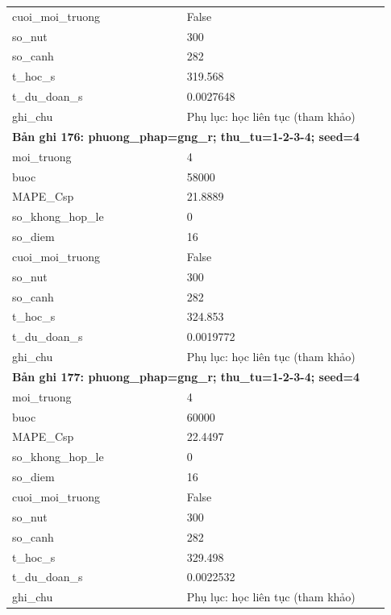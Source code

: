 \begin{longtable}{p{0.43\linewidth}p{0.50\linewidth}}
cuoi\_\allowbreak moi\_\allowbreak truong & False \\
so\_\allowbreak nut & 300 \\
so\_\allowbreak canh & 282 \\
t\_\allowbreak hoc\_\allowbreak s & 319.568 \\
t\_\allowbreak du\_\allowbreak doan\_\allowbreak s & 0.0027648 \\
ghi\_\allowbreak chu & Phụ lục: học liên tục (tham khảo) \\
\midrule
\multicolumn{2}{p{0.95\linewidth}}{\textbf{Bản ghi 176: phuong\_phap=gng\_r; thu\_tu=1-2-3-4; seed=4}} \\
moi\_\allowbreak truong & 4 \\
buoc & 58000 \\
MAPE\_\allowbreak Csp & 21.8889 \\
so\_\allowbreak khong\_\allowbreak hop\_\allowbreak le & 0 \\
so\_\allowbreak diem & 16 \\
cuoi\_\allowbreak moi\_\allowbreak truong & False \\
so\_\allowbreak nut & 300 \\
so\_\allowbreak canh & 282 \\
t\_\allowbreak hoc\_\allowbreak s & 324.853 \\
t\_\allowbreak du\_\allowbreak doan\_\allowbreak s & 0.0019772 \\
ghi\_\allowbreak chu & Phụ lục: học liên tục (tham khảo) \\
\midrule
\multicolumn{2}{p{0.95\linewidth}}{\textbf{Bản ghi 177: phuong\_phap=gng\_r; thu\_tu=1-2-3-4; seed=4}} \\
moi\_\allowbreak truong & 4 \\
buoc & 60000 \\
MAPE\_\allowbreak Csp & 22.4497 \\
so\_\allowbreak khong\_\allowbreak hop\_\allowbreak le & 0 \\
so\_\allowbreak diem & 16 \\
cuoi\_\allowbreak moi\_\allowbreak truong & False \\
so\_\allowbreak nut & 300 \\
so\_\allowbreak canh & 282 \\
t\_\allowbreak hoc\_\allowbreak s & 329.498 \\
t\_\allowbreak du\_\allowbreak doan\_\allowbreak s & 0.0022532 \\
ghi\_\allowbreak chu & Phụ lục: học liên tục (tham khảo) \\

\end{longtable}
